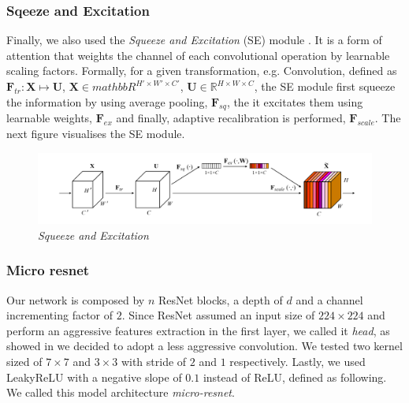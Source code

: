 \documentclass[../document.tex]{subfiles}
\begin{document}
\subsubsection{Sqeeze and Excitation}
Finally, we also used the \emph{Squeeze and Excitation} (SE) module \cite{hu2017squeeze}. It is a form of attention that weights the channel of each convolutional operation by learnable scaling factors. Formally, for a given transformation, e.g. Convolution, defined as $\bm{F}_{tr}  : \bm{X} \mapsto \bm{U}$, $\bm{X} \in mathbb{R}^{H' \times W' \times C'}$, $\bm{U} \in \mathbb{R}^{H \times W \times C}$, the SE module first squeeze the information by using average pooling, $\bm{F}_{sq}$, the it excitates them using learnable weights, $\bm{F}_{ex}$ and finally, adaptive recalibration is performed, $\bm{F}_{scale}$.
The next figure visualises the SE module.
\begin{figure}[H]
    \centering
    \includegraphics[width=\linewidth]{../img/implementation/estimator/se.png}
    \caption{\emph{Squeeze and Excitation} \cite{hu2017squeeze}}
\end{figure}
\subsubsection{Micro resnet}
Our network is composed by $n$ ResNet blocks, a depth of $d$ and a channel incrementing factor of $2$. Since ResNet assumed an input size of $224\times224$ and perform an aggressive features extraction in the first layer, we called it \emph{head}, as showed in  we decided to adopt a less aggressive convolution. We tested two kernel sized of $7\times7$ and $3\times3$ with stride of $2$ and $1$ respectively. Lastly, we used LeakyReLU with a negative slope of $0.1$ instead of ReLU, defined as following. We called this model architecture \emph{micro-resnet}. 


\end{document}
